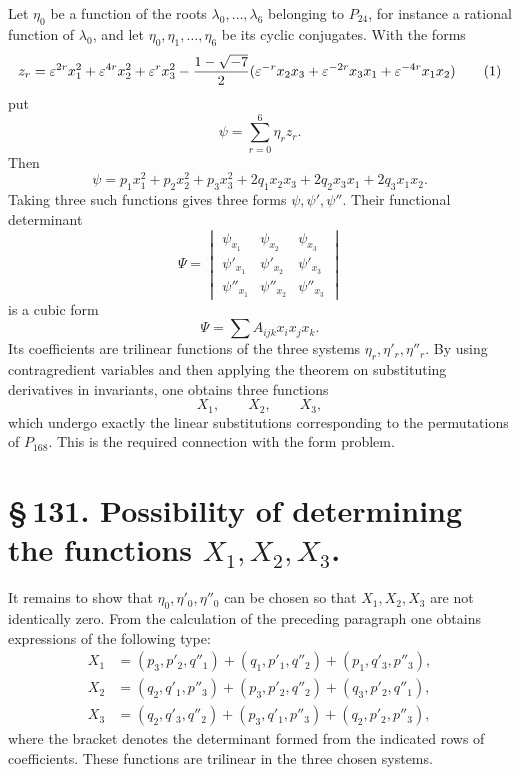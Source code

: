 \documentclass[11pt]{article}
\providecommand{\eps}{\varepsilon}
\providecommand{\eps}{\varepsilon}
\begin{document}
Let \(\eta_0\) be a function of the roots \(\lambda_0,\ldots,\lambda_6\) belonging to \(P_{24}\), for instance a rational function of \(\lambda_0\), and let \(\eta_0,\eta_1,\ldots,\eta_6\) be its cyclic conjugates. With the forms
\begin{equation}
z_r=\eps^{2r}x_1^2+\eps^{4r}x_2^2+\eps^rx_3^2-{1-\sqrt{-7}\over2}(\eps^{-r}x_2x_3+\eps^{-2r}x_3x_1+\eps^{-4r}x_1x_2)
\tag{1}
\end{equation}
put
\begin{equation}
\psi=\sum_{r=0}^6\eta_r z_r.
\tag{2}
\end{equation}
Then
\begin{equation}
\psi=p_1x_1^2+p_2x_2^2+p_3x_3^2+2q_1x_2x_3+2q_2x_3x_1+2q_3x_1x_2.
\tag{3}
\end{equation}
Taking three such functions gives three forms \(\psi,\psi',\psi''\). Their functional determinant
\begin{equation}
\Psi=
\begin{vmatrix}
\psi_{x_1}&\psi_{x_2}&\psi_{x_3}\\
\psi'_{x_1}&\psi'_{x_2}&\psi'_{x_3}\\
\psi''_{x_1}&\psi''_{x_2}&\psi''_{x_3}
\end{vmatrix}
\tag{4}
\end{equation}
is a cubic form
\begin{equation}
\Psi=\sum A_{ijk}x_ix_jx_k.
\tag{5}
\end{equation}
Its coefficients are trilinear functions of the three systems \(\eta_r,\eta'_r,\eta''_r\). By using contragredient variables and then applying the theorem on substituting derivatives in invariants, one obtains three functions
\begin{equation}
X_1,
\qquad X_2,
\qquad X_3,
\tag{6}
\end{equation}
which undergo exactly the linear substitutions corresponding to the permutations of \(P_{168}\). This is the required connection with the form problem.

\section*{\S\,131. Possibility of determining the functions \(X_1,X_2,X_3\).}

It remains to show that \(\eta_0,\eta'_0,\eta''_0\) can be chosen so that \(X_1,X_2,X_3\) are not identically zero. From the calculation of the preceding paragraph one obtains expressions of the following type:
\begin{equation}
\begin{aligned}
X_1&=(p_3,p'_2,q''_1)+(q_1,p'_1,q''_2)+(p_1,q'_3,p''_3),\\
X_2&=(q_2,q'_1,p''_3)+(p_3,p'_2,q''_2)+(q_3,p'_2,q''_1),\\
X_3&=(q_2,q'_3,q''_2)+(p_3,q'_1,p''_3)+(q_2,p'_2,p''_3),
\end{aligned}
\tag{1}
\end{equation}
where the bracket denotes the determinant formed from the indicated rows of coefficients. These functions are trilinear in the three chosen systems.
\end{document}
